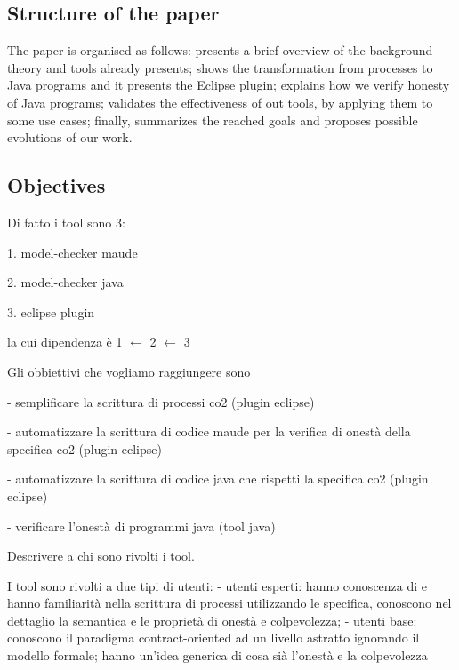 \subsection*{Structure of the paper}

The paper is organised as follows:  presents a brief overview of the background theory and tools already presents;
 shows the transformation from \coco processes
to Java programs and it presents the \coco Eclipse plugin;
 explains how we verify honesty of Java
programs;   validates the effectiveness of out
tools, by applying them to some use cases; finally,
 summarizes the reached goals and proposes
possible evolutions of our work.


\subsection{Objectives}
 Di fatto i tool sono 3:
 
 1. model-checker maude
 
 2. model-checker java
 
 3. eclipse plugin

 la cui dipendenza è 1 $\longleftarrow$ 2 $\longleftarrow$ 3
 
 Gli obbiettivi che vogliamo raggiungere sono
 
 - semplificare la scrittura di processi co2 (plugin eclipse)
 
 - automatizzare la scrittura di codice maude per la verifica di onestà della specifica co2 (plugin eclipse)
 
 - automatizzare la scrittura di codice java che rispetti la specifica co2 (plugin eclipse)
 
 - verificare l'onestà di programmi java (tool java)

 Descrivere a chi sono rivolti i tool.


I tool sono rivolti a due tipi di utenti:
- utenti esperti: hanno conoscenza di \coco e hanno familiarità nella scrittura
di processi utilizzando le specifica, conoscono nel dettaglio la semantica e le
proprietà di onestà e colpevolezza;
- utenti base: conoscono il paradigma contract-oriented ad un livello astratto 
ignorando il modello formale; hanno un'idea generica di cosa sià l'onestà 
e la colpevolezza
